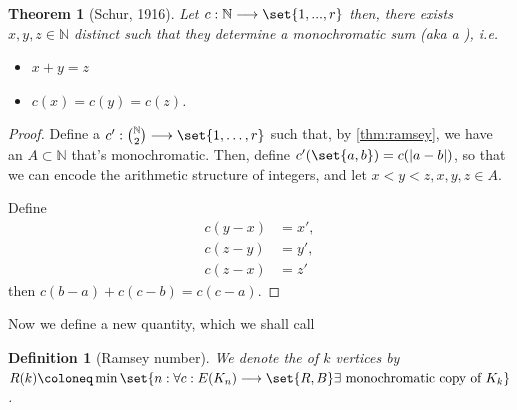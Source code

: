 \documentclass[english, dark, index]{Iart}
\newtheorem{theorem}{Theorem}[part]
\newtheorem{definition}{Definition}[part]
\begin{document}
	\begin{theorem}[Schur, 1916]\label{thm:schur}
		Let $ c:\mathbb{N}\longrightarrow\set{1,...,r} $ then, there exists $ x,y,z\in\mathbb{N} $ distinct such that they determine a monochromatic sum (aka a ), i.e.
		\begin{itemize}
			\item $ x+y=z $
			\item $ c(x)=c(y)=c(z) $.
		\end{itemize}
	\end{theorem}

	\begin{proof}
		Define a $ c':\binom{\mathbb{N}}{2}\longrightarrow \set{1,\ldots,r} $ such that, by \ref{thm:ramsey}, we have an $ A\subset\mathbb{N} $ that's monochromatic. Then, define $ c'(\set{a,b})=c(|a-b|) $, so that we can encode the arithmetic structure of integers, and let $ x<y<z,x,y,z\in A $.
		
		\begin{center}
			
			
		\end{center}
		
		Define
		\begin{align*}
			c(y-x)&=x',\\
			c(z-y)&=y',\\
			c(z-x)&=z'
		\end{align*}
		then $ c(b-a)+c(c-b)=c(c-a) $.
	\end{proof}

	

	Now we define a new quantity, which we shall call
	\begin{definition}[Ramsey number]
		We denote the  of $ k $ vertices by $ R(k)\coloneq\min\set{n:\forall c:E(K_n)\longrightarrow\set{R,B}\exists \textup{ monochromatic copy of }K_k} $.
	\end{definition}
\end{document}
